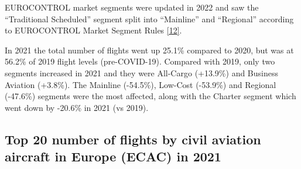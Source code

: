 \documentclass[
  11pt,
  a4paper,
]{book}
\begin{document}
EUROCONTROL market segments were updated in 2022 and saw the
``Traditional Scheduled'' segment split into ``Mainline'' and
``Regional'' according to EUROCONTROL Market Segment Rules
\protect\hyperlink{ref-ectl:market:seg:2022}{{[}12{]}}.

In 2021 the total number of flights went up 25.1\% compared to 2020, but
was at 56.2\% of 2019 flight levels (pre-COVID-19). Compared with 2019,
only two segments increased in 2021 and they were All-Cargo (+13.9\%)
and Business Aviation (+3.8\%). The Mainline (-54.5\%), Low-Cost
(-53.9\%) and Regional (-47.6\%) segments were the most affected, along
with the Charter segment which went down by -20.6\% in 2021 (vs 2019).

\hypertarget{top-20-number-of-flights-by-civil-aviation-aircraft-in-europe-ecac-in-2021}{%
\subsection{Top 20 number of flights by civil aviation aircraft in
Europe (ECAC) in
2021}\label{top-20-number-of-flights-by-civil-aviation-aircraft-in-europe-ecac-in-2021}}
\end{document}
